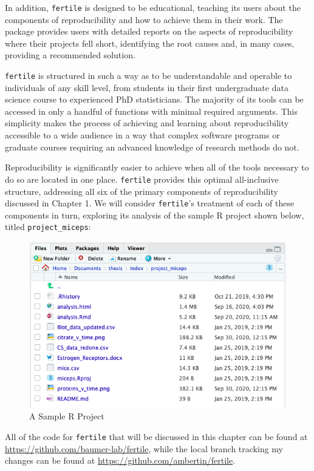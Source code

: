 \documentclass[12pt,twoside]{reedthesis}
\begin{document}
In addition, \texttt{fertile} is designed to be educational, teaching its users about the components of reproducibility and how to achieve them in their work. The package provides users with detailed reports on the aspects of reproducibility where their projects fell short, identifying the root causes and, in many cases, providing a recommended solution.

\texttt{fertile} is structured in such a way as to be understandable and operable to individuals of any skill level, from students in their first undergraduate data science course to experienced PhD statisticians. The majority of its tools can be accessed in only a handful of functions with minimal required arguments. This simplicity makes the process of achieving and learning about reproducibility accessible to a wide audience in a way that complex software programs or graduate courses requiring an advanced knowledge of research methods do not.

Reproducibility is significantly easier to achieve when all of the tools necessary to do so are located in one place. \texttt{fertile} provides this optimal all-inclusive structure, addressing all six of the primary components of reproducibility discussed in Chapter 1. We will consider \texttt{fertile}'s treatment of each of these components in turn, exploring its analysis of the sample R project shown below, titled \texttt{project\_miceps}:
\begin{figure}
\includegraphics[width=1\linewidth]{figure/sample-project} \caption{A Sample R Project}\label{fig:unnamed-chunk-9}
\end{figure}
All of the code for \texttt{fertile} that will be discussed in this chapter can be found at \url{https://github.com/baumer-lab/fertile}, while the local branch tracking my changes can be found at \url{https://github.com/ambertin/fertile}.
\end{document}
